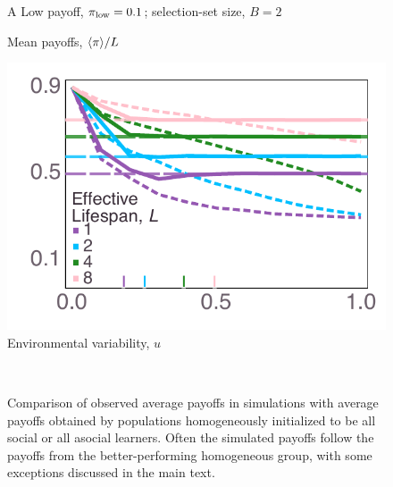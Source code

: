 \documentclass[letterpaper,11.5pt]{scrartcl}
\begin{document}
\clearpage
\begin{figure}
  \caption{Comparison of observed average payoffs in simulations with average payoffs
    obtained by populations homogeneously initialized to be all social or all asocial learners. Often the simulated payoffs follow the payoffs from the better-performing homogeneous group, with some exceptions discussed in the main text.}
  \label{fig:payoffs}
  \vspace{1em}
  \centering 
    {\textsf A \quad Low payoff, $\pi_{\mathrm{low}} = 0.1$; selection-set size, $B = 2$} \\
    \begin{minipage}[]{0.4\textwidth}
      \centering
      \begin{rotate}{90}
        {\parbox{3.0in}{
            \centering
            {\hspace{-7em} Mean payoffs, $\langle \pi \rangle / L$}
        }}
      \end{rotate}%
      \includegraphics[width=\textwidth]{Figures/mean_prev_net_payoff_over_u_lowpayoff=0.1_nbehaviors=2.pdf}
      \\[-0.8em]
      {\centering \quad Environmental variability, $u$}
    \end{minipage} \\[1.5em]
    \centering

\end{figure}
\end{document}
